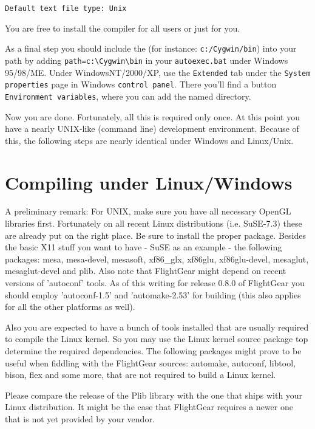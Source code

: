  \texttt{Default text file type: Unix}

 You are free to install the compiler for all users or just for you.

As a final step you should include the  (for instance:
\texttt{c:/Cygwin/bin}) into your path by adding \verb/path=c:\Cygwin\bin/ in
your \texttt{autoexec.bat} under Windows 95/98/ME. Under WindowsNT/2000/XP, use the \texttt{Extended} tab under the \texttt{System properties} page in Windows \texttt{control panel}. There you'll find a button \texttt{Environment variables}, where you can add the named directory.

Now you are done. Fortunately, all this is required only once. At this point you have
a nearly UNIX-like (command line) development environment. Because of this, the following
steps are nearly identical under Windows and Linux/Unix.

\section{Compiling \FlightGear{} under Linux/Windows }

A preliminary remark: For UNIX, make sure you have all necessary OpenGL
libraries first. Fortunately on all recent Linux distributions (i.e.
SuSE-7.3) these are already put on the right place. Be sure to install the
proper package. Besides the basic X11 stuff you want to have - SuSE as an
example - the following packages: mesa, mesa-devel, mesasoft, xf86\_glx,
xf86glu, xf86glu-devel, mesaglut, mesaglut-devel and plib. Also note that
FlightGear might depend on recent versions of 'autoconf' tools. As of this
writing for release 0.8.0 of FlightGear you should employ 'autoconf-1.5' and
'automake-2.53' for building (this also applies for all the other platforms
as well).

Also you are expected to have a bunch of tools installed that are usually
required to compile the Linux kernel. So you may use the Linux kernel source
package top determine the required dependencies. The following packages
might prove to be useful when fiddling with the FlightGear sources:
automake, autoconf, libtool, bison, flex and some more, that are not
required to build a Linux kernel.

Please compare the release of the Plib library with the one that ships with
your Linux distribution. It might be the case that FlightGear requires a
newer one that is not yet provided by your vendor.

